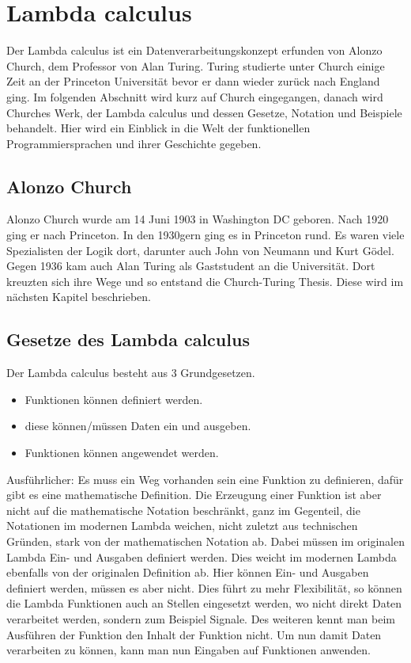\section{Lambda calculus}
Der Lambda calculus ist ein Datenverarbeitungskonzept erfunden von Alonzo Church, dem Professor von Alan Turing. Turing studierte unter Church einige Zeit an der Princeton Universität bevor er dann wieder zurück nach England ging. Im folgenden Abschnitt wird kurz auf Church eingegangen, danach wird Churches Werk, der Lambda calculus und dessen Gesetze, Notation und Beispiele behandelt. Hier wird ein Einblick in die Welt der funktionellen Programmiersprachen und ihrer Geschichte gegeben.
\subsection{Alonzo Church}
Alonzo Church wurde am 14 Juni 1903 in Washington DC geboren. \cite{lifechurch}
Nach 1920 ging er nach Princeton. In den 1930gern ging es in Princeton rund. Es waren viele Spezialisten der Logik dort, darunter auch John von Neumann und Kurt Gödel. Gegen 1936 kam auch Alan Turing als Gaststudent an die Universität. Dort kreuzten sich ihre Wege und so entstand die Church-Turing Thesis. Diese wird im nächsten Kapitel beschrieben.
\subsection{Gesetze des Lambda calculus}
Der Lambda calculus besteht aus 3 Grundgesetzen.
\begin{itemize}
\item Funktionen können definiert werden.
\item diese können/müssen Daten ein und ausgeben.
\item Funktionen können angewendet werden.
\end{itemize}
Ausführlicher: Es muss ein Weg vorhanden sein eine Funktion zu definieren, dafür gibt es eine mathematische Definition. Die Erzeugung einer Funktion ist aber nicht auf die mathematische Notation beschränkt, ganz im Gegenteil, die Notationen im modernen Lambda weichen, nicht zuletzt aus technischen Gründen, stark von der mathematischen Notation ab. Dabei müssen im originalen Lambda Ein- und Ausgaben definiert werden. Dies weicht im modernen Lambda ebenfalls von der originalen Definition ab. Hier können Ein- und Ausgaben definiert werden, müssen es aber nicht. Dies führt zu mehr Flexibilität, so können die Lambda Funktionen auch an Stellen eingesetzt werden, wo nicht direkt Daten verarbeitet werden, sondern zum Beispiel Signale. Des weiteren kennt man beim Ausführen der Funktion den Inhalt der Funktion nicht. Um nun damit Daten verarbeiten zu können, kann man nun Eingaben auf Funktionen anwenden.\cite{lambdacalculus}

